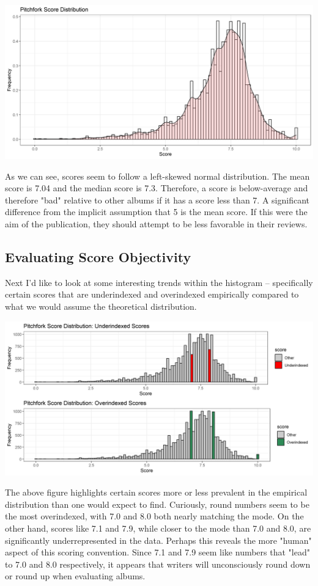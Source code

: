 \documentclass[a4paper,12pt]{article}
\begin{document}
\includegraphics[width = \linewidth]{"figures/score_distribution.png"}

As we can see, scores seem to follow a left-skewed normal distribution. The mean score is 7.04 and the median score is 7.3. Therefore, a score is below-average and therefore "bad" relative to other albums if it has a score less than 7. A significant difference from the implicit assumption that 5 is the mean score. If this were the aim of the publication, they should attempt to be less favorable in their reviews. 
\subsection{Evaluating Score Objectivity}
Next I'd like to look at some interesting trends within the histogram -- specifically certain scores that are underindexed and overindexed empirically compared to what we would assume the theoretical distribution. 

\includegraphics[width = \linewidth]{"figures/underoverindexing.png"}

The above figure highlights certain scores more or less prevalent in the empirical distribution than one would expect to find. Curiously, round numbers seem to be the most overindexed, with 7.0 and 8.0 both nearly matching the mode. On the other hand, scores like 7.1 and 7.9, while closer to the mode than 7.0 and 8.0, are significantly underrepresented in the data. Perhaps this reveals the more "human" aspect of this scoring convention. Since 7.1 and 7.9 seem like numbers that "lead" to 7.0 and 8.0 respectively, it appears that writers will unconsciously round down or round up when evaluating albums. 
\end{document}
